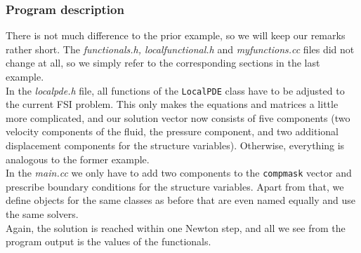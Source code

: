 \subsubsection{Program description}

There is not much difference to the prior example, so we will keep our remarks rather short. The \textit{functionals.h, localfunctional.h} and \textit{myfunctions.cc} files did not change at all, so we simply refer to the corresponding sections in the last example.\\
In the \textit{localpde.h} file, all functions of the \texttt{LocalPDE} class have to be adjusted to the current FSI problem. This only makes the equations and matrices a little more complicated, and our solution vector now consists of five components (two velocity components of the fluid, the pressure component, and two additional displacement components for the structure variables). Otherwise, everything is analogous to the former example.\\
In the \textit{main.cc} we only have to add two components to the \texttt{compmask} vector and prescribe boundary conditions for the structure variables. Apart from that, we define objects for the same classes as before that are even named equally and use the same solvers.\\ 
Again, the solution is reached within one Newton step, and all we see from the program output is the values of the functionals.